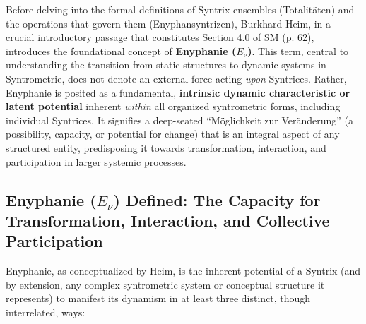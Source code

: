\documentclass[
    12pt,              %
    a4paper,           %
    headings=normal,   %
    twoside=true,      %
    BCOR=8mm,          %
]{scrbook}
\newcommand{\q}[1]{\enquote{#1}}
\begin{document}
Before delving into the formal definitions of Syntrix ensembles (Totalitäten) and the operations that govern them (Enyphansyntrizen), Burkhard Heim, in a crucial introductory passage that constitutes Section 4.0 of SM (p. 62), introduces the foundational concept of \textbf{Enyphanie (\(E_\nu\))}. This term, central to understanding the transition from static structures to dynamic systems in Syntrometrie, does not denote an external force acting \textit{upon} Syntrices. Rather, Enyphanie is posited as a fundamental, \textbf{intrinsic dynamic characteristic or latent potential} inherent \textit{within} all organized syntrometric forms, including individual Syntrices. It signifies a deep-seated \q{Möglichkeit zur Veränderung} (a possibility, capacity, or potential for change) that is an integral aspect of any structured entity, predisposing it towards transformation, interaction, and participation in larger systemic processes.

\subsection{Enyphanie (\(E_\nu\)) Defined: The Capacity for Transformation, Interaction, and Collective Participation}
\label{sec:ch4_enyphanie_defined_revised} 

Enyphanie, as conceptualized by Heim, is the inherent potential of a Syntrix (and by extension, any complex syntrometric system or conceptual structure it represents) to manifest its dynamism in at least three distinct, though interrelated, ways:
\end{document}

